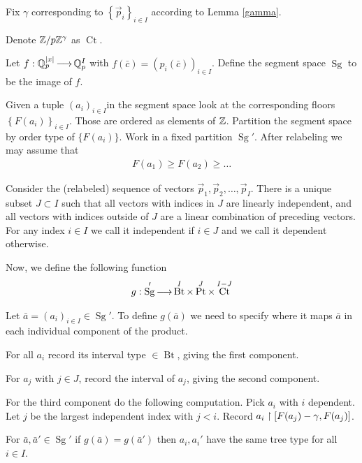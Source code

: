 \documentclass{amsart}
\newcommand{\curly}[1]{\left\{#1\right\}}
\DeclareMathOperator{\Sg}{Sg}
\DeclareMathOperator{\Bt}{Bt}
\DeclareMathOperator{\Pt}{Pt}
\DeclareMathOperator{\Ct}{Ct}
\begin{document}
Fix $\gamma$ corresponding to $\curly{\vec p_i}_{i \in I}$ according to Lemma \ref{gamma}.

\begin{Definition}
  Denote $\mathbb{Z}/p\mathbb{Z}^\gamma$ as $\Ct$.
\end{Definition}

\begin{Definition}
  Let $f: \mathbb{Q}_p^{|x|} \operatorname{\longrightarrow} \mathbb{Q}_p^I$ with $f(\bar c) = (p_i(\bar c))_{i \in I}$.
  Define the segment space $\Sg$ to be the image of $f$.	
\end{Definition}


Given a tuple $(a_i)_{i\in I}$in the segment space look at the corresponding floors $\curly{F(a_i)}_{i\in I}$.
Those are ordered as elements of $\mathbb{Z}$.
Partition the segment space by order type of $\{F(a_i)\}$.
Work in a fixed partition $\Sg'$.
After relabeling we may assume that
\begin{align*}
  F(a_1) \geq F(a_2) \geq \ldots 
\end{align*}

Consider the (relabeled) sequence of vectors $\vec p_1, \vec p_2, \ldots, \vec p_I$.
There is a unique subset $J \subset I$ such that all vectors with indices in $J$ are linearly independent, and all vectors with indices outside of $J$ are a linear combination of preceding vectors.
For any index $i \in I$ we call it independent if $i \in J$ and we call it dependent otherwise.

Now, we define the following function
\begin{align*}
  g: \Sg' \arr \Bt^I \times \Pt^J \times \Ct^{I - J}
\end{align*}

Let $\bar a = (a_i)_{i\in I} \in \Sg'$.
To define $g(\bar a)$ we need to specify where it maps $\bar a$ in each individual component of the product.

For all $a_i$ record its interval type $\in \Bt$, giving the first component.

For $a_j$ with $j \in J$, record the interval of $a_j$, giving the second component.

For the third component do the following computation.
Pick $a_i$ with $i$ dependent.
Let $j$ be the largest independent index with $j < i$.
Record $a_i \upharpoonright [F(a_j) - \gamma, F(a_j)]$.



\begin{Lemma}
  For $\bar a, \bar a' \in \Sg'$ if $g(\bar a) = g(\bar a')$ then $a_i, a_i'$ have the same tree type for all $i \in I$.	
\end{Lemma}
\end{document}
